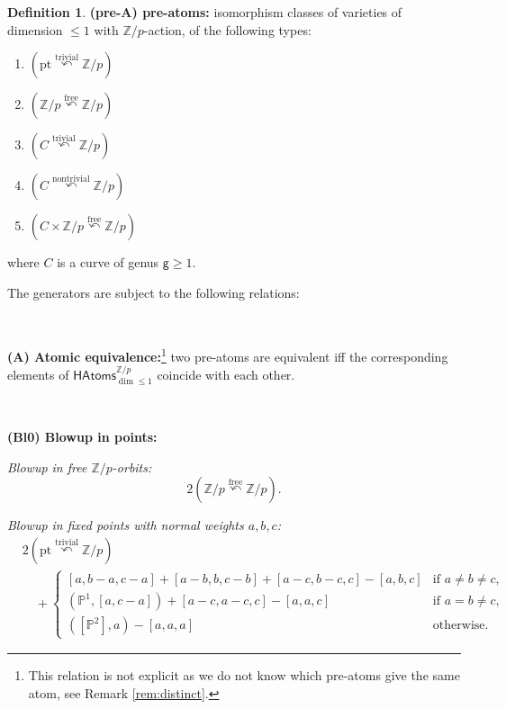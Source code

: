 \documentclass[12pt,a4paper]{amsart}
\theoremstyle{definition}
\newtheorem{definition}[theorem]{Definition}
\theoremstyle{remark}
\newcommand{\Z}{\mathbb{Z}}
\begin{document}
\begin{definition}
\noindent\textbf{(pre-A) pre-atoms:} isomorphism classes of varieties of dimension $\le 1$ with $\Z/p$-action, of the following types:
\begin{enumerate}
    \item $(\mathrm{pt}\stackrel{\mathrm{trivial}}{\curvearrowleft} \Z/p )$
    \item \( (\Z/p \stackrel{\mathrm{free}}{\curvearrowleft} \Z/p )\)
    \item \( (C\stackrel{\mathrm{trivial}}{\curvearrowleft} \Z/p )\)
    \item \( (C\stackrel{\mathrm{nontrivial}}{\curvearrowleft} \Z/p )\)
    \item \( (C\times \Z/p \stackrel{\mathrm{free}}{\curvearrowleft} \Z/p )\)
\end{enumerate}
where $C$ is a curve of genus $\mathsf g\ge 1$.







\medskip

The generators are subject to the following relations:

 \ 
 
\noindent\textbf{(A) Atomic equivalence:}\footnote{This relation is not explicit as we do not know which pre-atoms give the same atom, see Remark \ref{rem:distinct}.} two pre-atoms are equivalent iff the corresponding elements of \(\mathsf{HAtoms}^{\Z/p}_{\dim \leq 1}\) coincide with each other.

\ 


\noindent\textbf{(Bl0) Blowup in points:}
\begin{defsubenum}
    \item[(Bl0-a)] \emph{Blowup in free $\mathbb{Z}/p$-orbits:}
    \[ 2(\Z/p \stackrel{\mathrm{free}}{\curvearrowleft} \Z/p ).
    \]

    \item[(Bl0-b)] \emph{Blowup in fixed points with normal weights $a,b,c$:}
    \begin{align}
    &2(\mathrm{pt}\stackrel{\mathrm{trivial}}{\curvearrowleft} \Z/p ) \\
    &\quad + \begin{cases}
    [a,b-a,c-a] + [a-b,b,c-b] + [a-c,b-c,c] - [a,b,c] & \text{if } a \neq b \neq c, \\
    (\mathbb{P}^1,[a,c-a]) + [a-c, a-c,c] - [a, a,c] & \text{if } a = b \neq c, \\
    ([\mathbb{P}^2],a) - [a, a, a] & \text{otherwise}.
    \end{cases}
    \end{align}
\end{defsubenum}


\end{definition}
\end{document}

